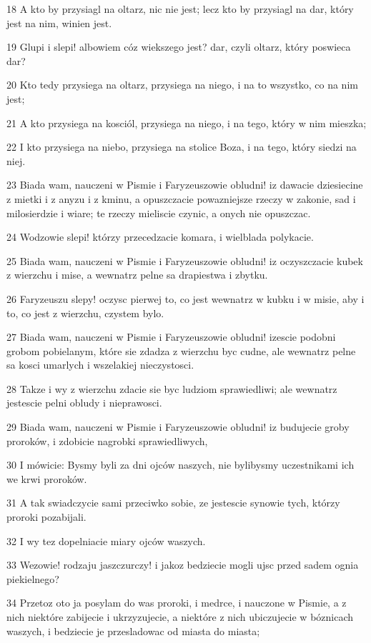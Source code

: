 \par 18 A kto by przysiagl na oltarz, nic nie jest; lecz kto by przysiagl na dar, który jest na nim, winien jest.
\par 19 Glupi i slepi! albowiem cóz wiekszego jest? dar, czyli oltarz, który poswieca dar?
\par 20 Kto tedy przysiega na oltarz, przysiega na niego, i na to wszystko, co na nim jest;
\par 21 A kto przysiega na kosciól, przysiega na niego, i na tego, który w nim mieszka;
\par 22 I kto przysiega na niebo, przysiega na stolice Boza, i na tego, który siedzi na niej.
\par 23 Biada wam, nauczeni w Pismie i Faryzeuszowie obludni! iz dawacie dziesiecine z mietki i z anyzu i z kminu, a opuszczacie powazniejsze rzeczy w zakonie, sad i milosierdzie i wiare; te rzeczy mieliscie czynic, a onych nie opuszczac.
\par 24 Wodzowie slepi! którzy przecedzacie komara, i wielblada polykacie.
\par 25 Biada wam, nauczeni w Pismie i Faryzeuszowie obludni! iz oczyszczacie kubek z wierzchu i mise, a wewnatrz pelne sa drapiestwa i zbytku.
\par 26 Faryzeuszu slepy! oczysc pierwej to, co jest wewnatrz w kubku i w misie, aby i to, co jest z wierzchu, czystem bylo.
\par 27 Biada wam, nauczeni w Pismie i Faryzeuszowie obludni! izescie podobni grobom pobielanym, które sie zdadza z wierzchu byc cudne, ale wewnatrz pelne sa kosci umarlych i wszelakiej nieczystosci.
\par 28 Takze i wy z wierzchu zdacie sie byc ludziom sprawiedliwi; ale wewnatrz jestescie pelni obludy i nieprawosci.
\par 29 Biada wam, nauczeni w Pismie i Faryzeuszowie obludni! iz budujecie groby proroków, i zdobicie nagrobki sprawiedliwych,
\par 30 I mówicie: Bysmy byli za dni ojców naszych, nie bylibysmy uczestnikami ich we krwi proroków.
\par 31 A tak swiadczycie sami przeciwko sobie, ze jestescie synowie tych, którzy proroki pozabijali.
\par 32 I wy tez dopelniacie miary ojców waszych.
\par 33 Wezowie! rodzaju jaszczurczy! i jakoz bedziecie mogli ujsc przed sadem ognia piekielnego?
\par 34 Przetoz oto ja posylam do was proroki, i medrce, i nauczone w Pismie, a z nich niektóre zabijecie i ukrzyzujecie, a niektóre z nich ubiczujecie w bóznicach waszych, i bedziecie je przesladowac od miasta do miasta;
